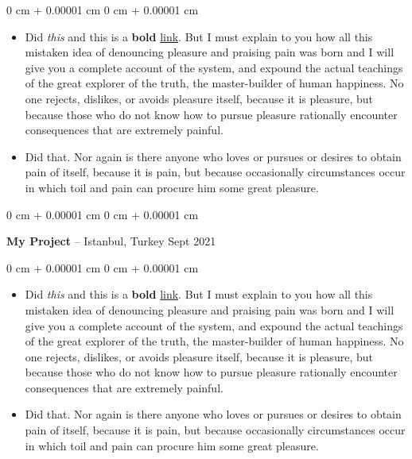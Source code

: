 \documentclass[10pt, letterpaper]{article}
\newenvironment{highlights}{
    \begin{itemize}[
        topsep=0.10 cm,
        parsep=0.10 cm,
        partopsep=0pt,
        itemsep=0pt,
        leftmargin=0 cm + 10pt
    ]
}{
    \end{itemize}
} %
\newenvironment{onecolentry}{
    \begin{adjustwidth}{
        0 cm + 0.00001 cm
    }{
        0 cm + 0.00001 cm
    }
}{
    \end{adjustwidth}
} %
\newenvironment{twocolentry}[2][]{
    \onecolentry
    \def\secondColumn{#2}
    \setcolumnwidth{\fill, 4.5 cm}
    \begin{paracol}{2}
}{
    \switchcolumn \raggedleft \secondColumn
    \end{paracol}
    \endonecolentry
} %
\begin{document}
        \vspace{0.10 cm}
        \begin{onecolentry}
            \begin{highlights}
                \item Did \textit{this} and this is a \textbf{bold} \href{https://example.com}{link}. But I must explain to you how all this mistaken idea of denouncing pleasure and praising pain was born and I will give you a complete account of the system, and expound the actual teachings of the great explorer of the truth, the master-builder of human happiness. No one rejects, dislikes, or avoids pleasure itself, because it is pleasure, but because those who do not know how to pursue pleasure rationally encounter consequences that are extremely painful.
                \item Did that. Nor again is there anyone who loves or pursues or desires to obtain pain of itself, because it is pain, but because occasionally circumstances occur in which toil and pain can procure him some great pleasure.
            \end{highlights}
        \end{onecolentry}


        \vspace{0.2 cm}

        \begin{twocolentry}{
            Sept 2021
        }
            \textbf{My Project} -- Istanbul, Turkey\end{twocolentry}

        \vspace{0.10 cm}
        \begin{onecolentry}
            \begin{highlights}
                \item Did \textit{this} and this is a \textbf{bold} \href{https://example.com}{link}. But I must explain to you how all this mistaken idea of denouncing pleasure and praising pain was born and I will give you a complete account of the system, and expound the actual teachings of the great explorer of the truth, the master-builder of human happiness. No one rejects, dislikes, or avoids pleasure itself, because it is pleasure, but because those who do not know how to pursue pleasure rationally encounter consequences that are extremely painful.
                \item Did that. Nor again is there anyone who loves or pursues or desires to obtain pain of itself, because it is pain, but because occasionally circumstances occur in which toil and pain can procure him some great pleasure.
            \end{highlights}
        \end{onecolentry}
\end{document}
